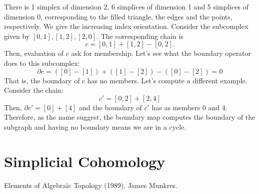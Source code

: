 \documentclass{article}
\begin{document}
\begin{center}
\end{center}

There is 1 simplex of dimension 2, 6 simplices of dimension 1 and 5 simplices of dimension 0,
corresponding to the filled triangle, the edges and the points, respectively. We give the 
increasing index orientation. Consider the subcomplex given by \([0,1], [1,2], [2,0]\).
The corresponding chain is
\begin{displaymath}
  c = [0,1] + [1,2] - [0, 2].
\end{displaymath}
Then, evaluation of \(c\) ask for membership. Let's see what the boundary operator does to this
subcomplex:
\begin{displaymath}
  \partial c = ([0] - [1]) + ([1] - [2]) - ([0] - [2]) = 0
\end{displaymath}
That is, the boundary of \(c\) has no members. Let's compute a different example. Consider
the chain:
\begin{displaymath}
  c' = [0, 2] + [2, 4]
\end{displaymath}
Then, \(\partial c' = [0] + [4]\) and the boundary of \(c'\) has as members 0 and 4.
Therefore, as the name suggest, the boundary map computes the boundary of the subgraph
and having no boundary means we are in a cycle.


\section{Simplicial Cohomology}

\begin{thebibliography}{9}
  Elements of Algebraic Topology (1989), James Munkres.
\end{thebibliography}
\end{document}
